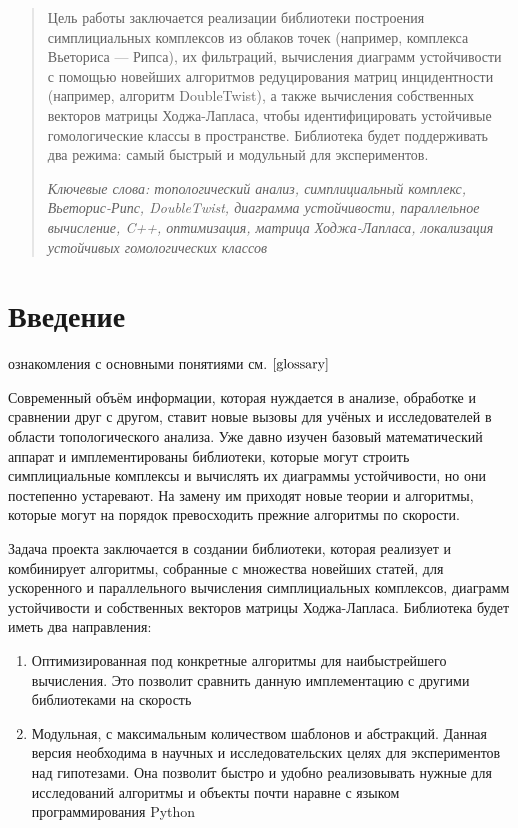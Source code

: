 \documentclass{article}
\begin{document}
\makeTitlePage

\tableofcontents
\newpage
\begin{abstract}
  Цель работы заключается реализации библиотеки построения симплициальных комплексов из облаков точек (например, комплекса Вьеториса — Рипса), их фильтраций, вычисления диаграмм устойчивости с помощью новейших алгоритмов редуцирования матриц инцидентности (например, алгоритм DoubleTwist), а также вычисления собственных векторов матрицы Ходжа-Лапласа, чтобы идентифицировать устойчивые гомологические классы в пространстве. Библиотека будет поддерживать два режима: самый быстрый и модульный для экспериментов.

  \textit{Ключевые слова: топологический анализ, симплициальный комплекс, Вьеторис-Рипс, DoubleTwist, диаграмма устойчивости, параллельное вычисление, C++, оптимизация, матрица Ходжа-Лапласа, локализация устойчивых гомологических классов}
\end{abstract}
\section{Введение}


{ ознакомления с основными понятиями см. $\ref{glossary}$}

Современный объём информации, которая нуждается в анализе, обработке и сравнении друг с другом, ставит новые вызовы для учёных и исследователей в области топологического анализа. Уже давно изучен базовый математический аппарат и имплементированы библиотеки, которые могут строить симплициальные комплексы и вычислять их диаграммы устойчивости, но они постепенно устаревают. На замену им приходят новые теории и алгоритмы, которые могут на порядок превосходить прежние алгоритмы по скорости.

Задача проекта заключается в создании библиотеки, которая реализует и комбинирует алгоритмы, собранные с множества новейших статей, для ускоренного и параллельного вычисления симплициальных комплексов, диаграмм устойчивости и собственных векторов матрицы Ходжа-Лапласа. Библиотека будет иметь два направления:
\begin{enumerate}
  \item Оптимизированная под конкретные алгоритмы для наибыстрейшего вычисления. Это позволит сравнить данную имплементацию с другими библиотеками на скорость
  \item Модульная, с максимальным количеством шаблонов и абстракций. Данная версия необходима в научных и исследовательских целях для экспериментов над гипотезами. Она позволит быстро и удобно реализовывать нужные для исследований алгоритмы и объекты почти наравне с языком программирования Python
\end{enumerate}
\end{document}
